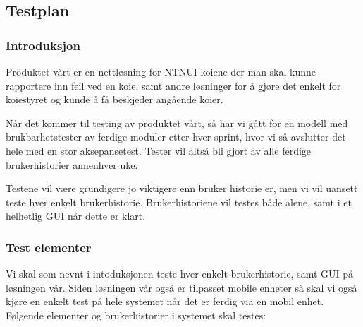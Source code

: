 \subsection{Testplan}
\subsubsection{Introduksjon}
Produktet vårt er en nettløsning for NTNUI koiene der man skal kunne rapportere inn feil ved en koie, samt andre løsninger for å gjøre det enkelt for koiestyret og kunde å få beskjeder angående koier. 

Når det kommer til testing av produktet vårt, så har vi gått for en modell med brukbarhetstester av ferdige moduler etter hver sprint, hvor vi så avslutter det hele med en stor aksepansetest. Tester vil altså bli gjort av alle ferdige brukerhistorier annenhver uke. 

Testene vil være grundigere jo viktigere enn bruker historie er, men vi vil uansett teste hver enkelt brukerhistorie. Brukerhistoriene vil testes både alene, samt i et helhetlig GUI når dette er klart. 



\subsubsection{Test elementer}

Vi skal som nevnt i intoduksjonen teste hver enkelt brukerhistorie, samt GUI på løsningen vår. Siden løsningen vår også er tilpasset mobile enheter så skal vi også kjøre en enkelt test på hele systemet når det er ferdig via en mobil enhet. Følgende elementer og brukerhistorier i systemet skal testes: 

